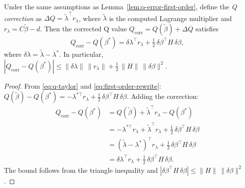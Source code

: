 \begin{lemma}\label{lem:q-correction-second-order}
Under the same assumptions as Lemma~\ref{lem:q-error-first-order},
define the \emph{Q correction} as $\Delta Q = \tilde\lambda^\top r_\lambda$,
where $\tilde\lambda$ is the computed Lagrange multiplier and
$r_\lambda = C\tilde\beta - d$.
Then the corrected Q value
$Q_{\mathrm{corr}} = Q(\tilde\beta) + \Delta Q$ satisfies
\[
  Q_{\mathrm{corr}} - Q(\beta^*)
  = \delta\lambda^\top r_\lambda
    + \tfrac{1}{2}\,\delta\beta^\top H\,\delta\beta,
\]
where $\delta\lambda = \tilde\lambda - \lambda^*$.
In particular,
$|Q_{\mathrm{corr}} - Q(\beta^*)|
  \leq \|\delta\lambda\|\,\|r_\lambda\|
    + \tfrac{1}{2}\,\|H\|\,\|\delta\beta\|^2$.
\end{lemma}

\begin{proof}
From \eqref{eq:q-taylor} and \eqref{eq:first-order-rewrite}:
$Q(\tilde\beta) - Q(\beta^*) = -\lambda^{*\top} r_\lambda
+ \tfrac{1}{2}\,\delta\beta^\top H\,\delta\beta$. Adding the correction:
\begin{align*}
  Q_{\mathrm{corr}} - Q(\beta^*)
  &= Q(\tilde\beta) + \tilde\lambda^\top r_\lambda - Q(\beta^*) \\
  &= -\lambda^{*\top} r_\lambda + \tilde\lambda^\top r_\lambda
    + \tfrac{1}{2}\,\delta\beta^\top H\,\delta\beta \\
  &= (\tilde\lambda - \lambda^*)^\top r_\lambda
    + \tfrac{1}{2}\,\delta\beta^\top H\,\delta\beta \\
  &= \delta\lambda^\top r_\lambda
    + \tfrac{1}{2}\,\delta\beta^\top H\,\delta\beta.
\end{align*}
The bound follows from the triangle inequality and
$|\delta\beta^\top H\,\delta\beta| \leq \|H\|\,\|\delta\beta\|^2$.
\end{proof}


